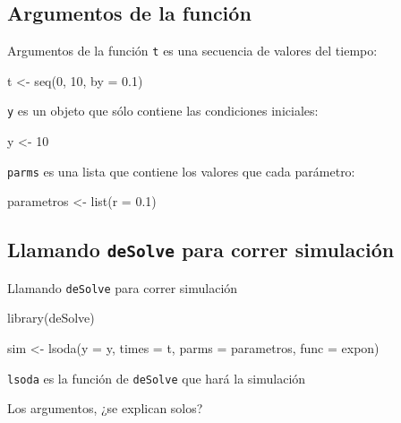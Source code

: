\documentclass[
  11pt,
  ignorenonframetext,
]{beamer}
\newenvironment{Shaded}{}{}
\newcommand{\AttributeTok}[1]{\textcolor[rgb]{0.49,0.56,0.16}{#1}}
\newcommand{\DecValTok}[1]{\textcolor[rgb]{0.25,0.63,0.44}{#1}}
\newcommand{\FloatTok}[1]{\textcolor[rgb]{0.25,0.63,0.44}{#1}}
\newcommand{\FunctionTok}[1]{\textcolor[rgb]{0.02,0.16,0.49}{#1}}
\newcommand{\NormalTok}[1]{#1}
\newcommand{\OtherTok}[1]{\textcolor[rgb]{0.00,0.44,0.13}{#1}}
\begin{document}
\hypertarget{argumentos-de-la-funciuxf3n}{%
\subsection{Argumentos de la
función}\label{argumentos-de-la-funciuxf3n}}

\begin{frame}[fragile]{Argumentos de la función}
\texttt{t} es una secuencia de valores del tiempo:

\begin{Shaded}
\begin{Highlighting}[]
\NormalTok{t }\OtherTok{\textless{}{-}} \FunctionTok{seq}\NormalTok{(}\DecValTok{0}\NormalTok{, }\DecValTok{10}\NormalTok{, }\AttributeTok{by =} \FloatTok{0.1}\NormalTok{)}
\end{Highlighting}
\end{Shaded}

\texttt{y} es un objeto que sólo contiene las condiciones iniciales:

\begin{Shaded}
\begin{Highlighting}[]
\NormalTok{y }\OtherTok{\textless{}{-}} \DecValTok{10}
\end{Highlighting}
\end{Shaded}

\texttt{parms} es una lista que contiene los valores que cada parámetro:

\begin{Shaded}
\begin{Highlighting}[]
\NormalTok{parametros }\OtherTok{\textless{}{-}} \FunctionTok{list}\NormalTok{(}\AttributeTok{r =} \FloatTok{0.1}\NormalTok{)}
\end{Highlighting}
\end{Shaded}
\end{frame}

\hypertarget{llamando-desolve-para-correr-simulaciuxf3n}{%
\subsection{\texorpdfstring{Llamando \texttt{deSolve} para correr
simulación}{Llamando deSolve para correr simulación}}\label{llamando-desolve-para-correr-simulaciuxf3n}}

\begin{frame}[fragile]{Llamando \texttt{deSolve} para correr simulación}
\begin{Shaded}
\begin{Highlighting}[]
\FunctionTok{library}\NormalTok{(deSolve)}

\NormalTok{sim }\OtherTok{\textless{}{-}} \FunctionTok{lsoda}\NormalTok{(}\AttributeTok{y =}\NormalTok{ y, }\AttributeTok{times =}\NormalTok{ t, }\AttributeTok{parms =}\NormalTok{ parametros, }\AttributeTok{func =}\NormalTok{ expon)}
\end{Highlighting}
\end{Shaded}

\texttt{lsoda} es la función de \texttt{deSolve} que hará la simulación

Los argumentos, ¿se explican solos?
\end{frame}
\end{document}
